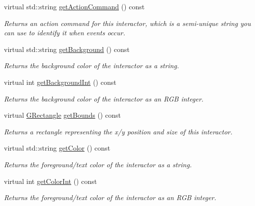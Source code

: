 \begin{DoxyCompactItemize}
virtual std\+::string \mbox{\hyperlink{classsgl_1_1GInteractor_a94eb4276000c4fdfb508ce9e6317a82a}{get\+Action\+Command}} () const
\begin{DoxyCompactList}\small\item\em Returns an action command for this interactor, which is a semi-\/unique string you can use to identify it when events occur. \end{DoxyCompactList}\item 
virtual std\+::string \mbox{\hyperlink{classsgl_1_1GInteractor_a808e22cc1fdfbecf71ed8c64ef4600e0}{get\+Background}} () const
\begin{DoxyCompactList}\small\item\em Returns the background color of the interactor as a string. \end{DoxyCompactList}\item 
virtual int \mbox{\hyperlink{classsgl_1_1GInteractor_a9e827257a55cb8cf4d9de2ec6bcfd7a0}{get\+Background\+Int}} () const
\begin{DoxyCompactList}\small\item\em Returns the background color of the interactor as an R\+GB integer. \end{DoxyCompactList}\item 
virtual \mbox{\hyperlink{structsgl_1_1GRectangle}{G\+Rectangle}} \mbox{\hyperlink{classsgl_1_1GInteractor_a29e6ac35a0b48f491a4c88194cc5da3b}{get\+Bounds}} () const
\begin{DoxyCompactList}\small\item\em Returns a rectangle representing the x/y position and size of this interactor. \end{DoxyCompactList}\item 
virtual std\+::string \mbox{\hyperlink{classsgl_1_1GInteractor_aa061dfa488c31e18549d64363c1d0e34}{get\+Color}} () const
\begin{DoxyCompactList}\small\item\em Returns the foreground/text color of the interactor as a string. \end{DoxyCompactList}\item 
virtual int \mbox{\hyperlink{classsgl_1_1GInteractor_a9635c7af766cdc3417f346683fa0e6c1}{get\+Color\+Int}} () const
\begin{DoxyCompactList}\small\item\em Returns the foreground/text color of the interactor as an R\+GB integer. \end{DoxyCompactList}\item 

\end{DoxyCompactItemize}
